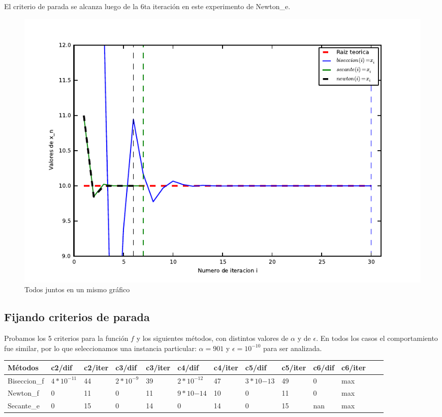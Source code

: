 El criterio de parada se alcanza luego de la 6ta iteración en este experimento de Newton\_e.

\begin{figure}[!h]
	\begin{center}
		  \includegraphics[keepaspectratio]{../Imagenes/exp2/todos_juntos.pdf}
		  \caption{Todos juntos en un mismo gráfico}
		  \label{fig:contra1}
	\end{center}
\end{figure}
\FloatBarrier

\subsection{Fijando criterios de parada}

Probamos los 5 criterios para la función $f$ y los siguientes métodos, con distintos valores de $\alpha$ y de $\epsilon$. En todos los casos el comportamiento fue similar, por lo que
seleccionamos una instancia particular: $\alpha = 901$ y $\epsilon=10^{-10}$ para ser analizada.

\begin{center}
    \small{
    \begin{tabular}{| l | l | l | l | l | l | l | l | l | l | l | l | l |}
    \hline
    Métodos & c2/dif & c2/iter & c3/dif & c3/iter & c4/dif & c4/iter & c5/dif & c5/iter & c6/dif & c6/iter \\ \hline
    Biseccion\_f & $4*10^{-11}$ & 44 & $2*10^{-9}$ & 39 & $2*10^{-12}$ & 47 & $3*10{-13}$ & 49 & 0 & max\\ \hline
    Newton\_f & 0 & 11 & 0 & 11 & $9*10{-14}$ & 10 & 0 & 11 & 0 & max \\ \hline
    Secante\_e & 0 & 15 & 0 & 14 & 0 & 14 & 0 & 15 & nan & max \\ \hline
    \end{tabular}
    }
\end{center}

